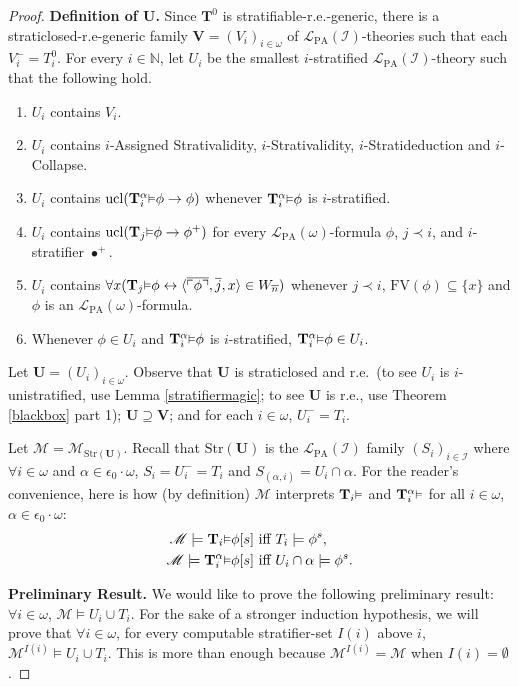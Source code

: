 \documentclass[reqno]{article}
\theoremstyle{definition}
\def\N{\mathbb{N}}
\def\L{\mathscr{L}}
\def\M{\mathscr{M}}
\def\T{\mathbf{T}}
\def\U{\mathbf{U}}
\def\V{\mathbf{V}}
\def\FV{\mathrm{FV}}
\def\LPA{\L_{\mathrm{PA}}}
\def\epom{\epsilon_0\cdot\omega}
\def\indset{\mathcal I}
\renewcommand{\Pr}[1]{\T_{#1}\mbox{\small${\vDash}$}}
\newcommand{\Prr}[2]{\T^{#1}_{#2}\mbox{\small${\vDash}$}}
\newcommand{\ucl}[1]{\mathrm{ucl}(#1)}
\newcommand{\str}[1]{\mathrm{Str}(#1)} \newcommand{\Str}[1]{\str{#1}}
\begin{document}
\begin{proof}
\item
\textbf{Definition of $\U$.}
Since $\T^0$ is stratifiable-r.e.-generic, there is 
a straticlosed-r.e-generic
family $\V=(V_i)_{i\in\omega}$ of $\LPA(\indset)$-theories such that each $V^-_i=T^0_i$.
For every $i\in\N$, let $U_i$ be the smallest
$i$-stratified $\LPA(\indset)$-theory such that the following hold.
\begin{enumerate}
\item $U_i$ contains $V_i$.
\item $U_i$ contains $i$-Assigned Strativalidity, $i$-Strativalidity, $i$-Stratideduction and $i$-Collapse.
\item $U_i$ contains $\ucl{\Prr\alpha i\phi\rightarrow\phi}$ whenever $\Prr\alpha i\phi$ is $i$-stratified.
\item $U_i$ contains $\ucl{\Pr j\phi\rightarrow\phi^+}$ for every $\LPA(\omega)$-formula $\phi$, $j\prec i$,
and $i$-stratifier $\bullet^+$.
\item $U_i$ contains $\forall x(\Pr j\phi\leftrightarrow\langle\overline{\ulcorner\phi\urcorner},\overline j,x\rangle\in W_{\overline n})$
whenever $j\prec i$, $\FV(\phi)\subseteq\{x\}$ and $\phi$ is an $\LPA(\omega)$-formula.
\item Whenever $\phi\in U_i$ and $\Prr\alpha i\phi$ is $i$-stratified, $\Prr\alpha i\phi\in U_i$.
\end{enumerate}
Let $\U=(U_i)_{i\in\omega}$.  Observe that $\U$ is straticlosed and r.e.~(to see $U_i$ is
$i$-unistratified, use
Lemma \ref{stratifiermagic}; to see $\U$ is r.e., use
Theorem \ref{blackbox} part 1); $\U\supseteq\V$; and for each $i\in\omega$,
$U_i^-=T_i$.

Let $\M=\M_{\str{\U}}$.
Recall that
$\str{\U}$ is the $\LPA(\indset)$ family $(S_i)_{i\in\indset}$
where $\forall i\in\omega$ and $\alpha\in\epom$, $S_i=U^-_i=T_i$ and
$S_{(\alpha,i)}=U_i\cap \alpha$.
For the reader's convenience, here is how (by definition)
$\M$ interprets $\Pr i$ and $\Prr \alpha i$ for all $i\in\omega$, $\alpha\in\epom$:
\begin{align*}
    \M\models \Pr i \phi[s] &\mbox{ iff } T_i\models \phi^s,\\
    \M\models \Prr \alpha i \phi[s] &\mbox{ iff } U_i\cap \alpha\models\phi^s.
\end{align*}

\item
\textbf{Preliminary Result.}
We would like to prove the following preliminary result:
$\forall i\in\omega$, $\M\models U_i\cup T_i$.
For the sake of a stronger induction hypothesis, we will prove that
$\forall i\in\omega$, for every computable stratifier-set $I(i)$ above $i$,
$\M^{I(i)}\models U_i\cup T_i$.
This is more than enough because $\M^{I(i)}=\M$ when
$I(i)=\emptyset$.


\end{proof}
\end{document}
